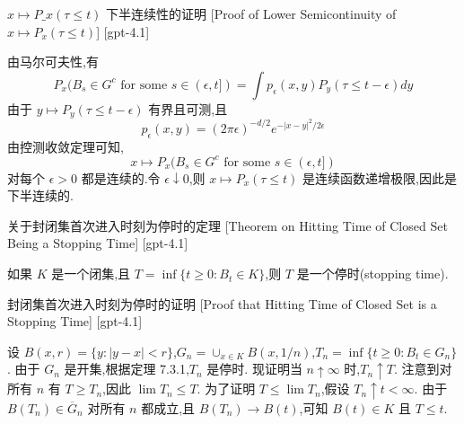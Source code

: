 \documentclass[UTF8]{ctexart}
\begin{document}
    
    
    \begin{prf}
        {$x \mapsto P\_x(\tau \leq t)$ 下半连续性的证明}
        [Proof of Lower Semicontinuity of $x \mapsto P_x(\tau \leq t)$]
        [gpt-4.1]
        
由马尔可夫性,有
\[
P_x(B_s \in G^c \text{ for some } s \in (\epsilon, t]) = \int p_\epsilon(x, y) P_y(\tau \leq t - \epsilon) dy
\]
由于 $y \mapsto P_y(\tau \leq t - \epsilon)$ 有界且可测,且
\[
p_\epsilon(x, y) = (2\pi \epsilon)^{-d/2} e^{-|x - y|^2 / 2\epsilon}
\]
由控测收敛定理可知,
\[
x \mapsto P_x(B_s \in G^c \text{ for some } s \in (\epsilon, t])
\]
对每个 $\epsilon > 0$ 都是连续的.令 $\epsilon \downarrow 0$,则 $x \mapsto P_x(\tau \leq t)$ 是连续函数递增极限,因此是下半连续的.

    \end{prf}
    
    
    
    \begin{thm}
        {关于封闭集首次进入时刻为停时的定理}
        [Theorem on Hitting Time of Closed Set Being a Stopping Time]
        [gpt-4.1]
        
如果 $K$ 是一个闭集,且 $T = \operatorname*{inf} \{ t \geq 0 : B_{t} \in K \}$,则 $T$ 是一个停时(stopping time).

    \end{thm}
    
    
    
    \begin{prf}
        {封闭集首次进入时刻为停时的证明}
        [Proof that Hitting Time of Closed Set is a Stopping Time]
        [gpt-4.1]
        
设 $B(x, r) = \{ y : | y - x | < r \}$,$G_{n} = \cup_{x \in K} B(x, 1/n)$,$T_{n} = \operatorname*{inf} \{ t \geq 0 : B_{t} \in G_{n} \}$.
由于 $G_{n}$ 是开集,根据定理 7.3.1,$T_{n}$ 是停时.
现证明当 $n \uparrow \infty$ 时,$T_{n} \uparrow T$.
注意到对所有 $n$ 有 $T \geq T_{n}$,因此 $\lim T_{n} \leq T$.
为了证明 $T \leq \lim T_{n}$,假设 $T_{n} \uparrow t < \infty$.
由于 $B(T_{n}) \in \overline{G}_{n}$ 对所有 $n$ 都成立,且 $B(T_{n}) \to B(t)$,可知 $B(t) \in K$ 且 $T \leq t$.

    \end{prf}
    
    
    
\end{document}
